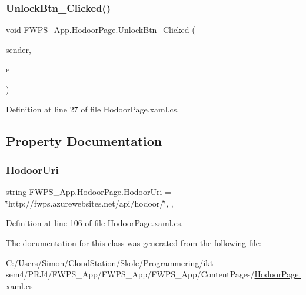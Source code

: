 \subsubsection{\texorpdfstring{Unlock\+Btn\+\_\+\+Clicked()}{UnlockBtn\_Clicked()}}
{\footnotesize\ttfamily void F\+W\+P\+S\+\_\+\+App.\+Hodoor\+Page.\+Unlock\+Btn\+\_\+\+Clicked (\begin{DoxyParamCaption}\item[{object}]{sender,  }\item[{Event\+Args}]{e }\end{DoxyParamCaption})\hspace{0.3cm}{\ttfamily [private]}}



Definition at line 27 of file Hodoor\+Page.\+xaml.\+cs.



\subsection{Property Documentation}
\mbox{\label{class_f_w_p_s___app_1_1_hodoor_page_a27c80c2b164fe0765232020a13c52555}} 
\subsubsection{\texorpdfstring{Hodoor\+Uri}{HodoorUri}}
{\footnotesize\ttfamily string F\+W\+P\+S\+\_\+\+App.\+Hodoor\+Page.\+Hodoor\+Uri = \char`\"{}http\+://fwps.\+azurewebsites.\+net/api/hodoor/\char`\"{}\hspace{0.3cm}{\ttfamily [static]}, {\ttfamily [get]}, {\ttfamily [set]}}



Definition at line 106 of file Hodoor\+Page.\+xaml.\+cs.



The documentation for this class was generated from the following file\+:\begin{DoxyCompactItemize}
\item 
C\+:/\+Users/\+Simon/\+Cloud\+Station/\+Skole/\+Programmering/ikt-\/sem4/\+P\+R\+J4/\+F\+W\+P\+S\+\_\+\+App/\+F\+W\+P\+S\+\_\+\+App/\+F\+W\+P\+S\+\_\+\+App/\+Content\+Pages/\mbox{\hyperlink{_hodoor_page_8xaml_8cs}{Hodoor\+Page.\+xaml.\+cs}}\end{DoxyCompactItemize}
